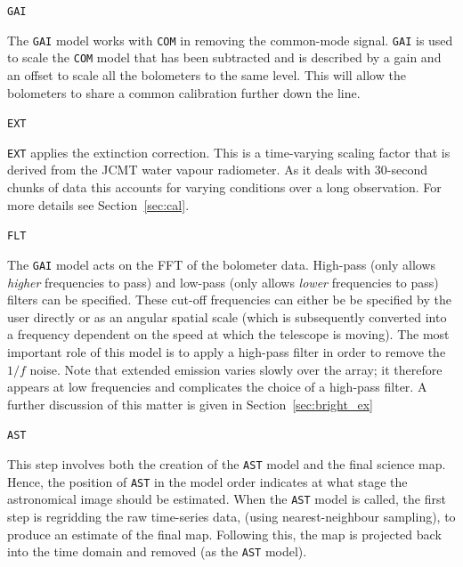 \documentclass[twoside,11pt]{article}
\renewcommand{\_}{\texttt{\symbol{95}}}
\begin{document}
\begin{minipage}[t]{0.07\linewidth}
\texttt{GAI}
\end{minipage}
\begin{minipage}[t]{0.92\linewidth}The \texttt{GAI} model works with
\texttt{COM} in removing the common-mode signal. \texttt{GAI} is used to
scale the \texttt{COM} model that has been subtracted and is described by
a gain and an offset to scale all the bolometers to the same level. This
will allow the bolometers to share a common calibration further down the
line. \\
\end{minipage}
\begin{minipage}[t]{0.07\linewidth}
\texttt{EXT}
\end{minipage}
\begin{minipage}[t]{0.92\linewidth}\texttt{EXT} applies the extinction
correction. This is a time-varying scaling factor that is derived from
the JCMT water vapour radiometer. As it deals with 30-second chunks of
data this accounts for varying conditions over a long observation. For
more details see Section~\ref{sec:cal}. \\
\end{minipage}
\begin{minipage}[t]{0.07\linewidth}
\texttt{FLT}
\end{minipage}
\begin{minipage}[t]{0.92\linewidth}The \texttt{GAI} model acts on the FFT
of the bolometer data. High-pass (only allows \emph{higher} frequencies to
pass) and low-pass (only allows \emph{lower} frequencies to pass) filters
can be specified. These cut-off frequencies can either be be specified by
the user directly or as an angular spatial scale (which is subsequently
converted into a frequency dependent on the speed at which the
telescope is moving). The most important role of this model is to
apply a high-pass filter in order to remove the $1/f$ noise. Note that
extended emission varies slowly over the array; it therefore appears
at low frequencies and complicates the choice of a high-pass filter. A
further discussion of this matter is given in
Section~\ref{sec:bright_ex}\\
\end{minipage}
\begin{minipage}[t]{0.07\linewidth}
\texttt{AST}
\end{minipage}
\begin{minipage}[t]{0.92\linewidth}This step involves both the creation of the
\texttt{AST} model and the final science map. Hence, the position of
\texttt{AST} in the model order indicates at what stage the astronomical
image should be estimated. When the \texttt{AST} model is called, the first
step is regridding the raw time-series data, (using nearest-neighbour sampling),
to produce an estimate of the final map. Following this, the map is
projected back into the time domain and removed (as the \texttt{AST}
model).\\
\end{minipage}
\end{document}

